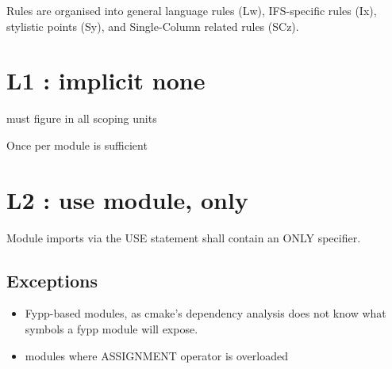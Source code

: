 \documentclass[letterpaper,10pt,english]{sphinxmanual}
\begin{document}
Rules are organised into general language rules (Lw), IFS-specific rules (Ix), stylistic
points (Sy), and Single-Column related rules (SCz).


\section{L1 : implicit none}
\label{\detokenize{rules/L1:l1-implicit-none}}\label{\detokenize{rules/L1::doc}}
 must figure in all scoping units

Once per module is sufficient


\section{L2 : use module, only}
\label{\detokenize{rules/L2:l2-use-module-only}}\label{\detokenize{rules/L2::doc}}
Module imports via the USE statement shall contain an ONLY specifier.


\begin{sphinxVerbatim}[commandchars=\\\{\}]
\end{sphinxVerbatim}


\begin{sphinxVerbatim}[commandchars=\\\{\}]
   
         
\end{sphinxVerbatim}


\subsection{Exceptions}
\label{\detokenize{rules/L2:exceptions}}\begin{itemize}
\item {} 
Fypp-based modules, as cmake’s dependency analysis does not know what symbols a fypp module will expose.

\item {} 
modules where ASSIGNMENT operator is overloaded

\end{itemize}
\end{document}
